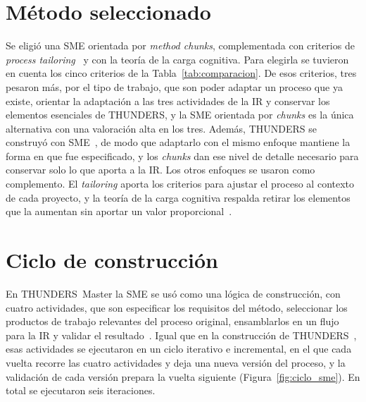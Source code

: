 \documentclass[12pt,letterpaper,oneside]{report}
\begin{document}
\section{Método seleccionado}
\label{sec:metodo_seleccionado}
Se eligió una SME orientada por \textit{method chunks}, complementada con
criterios de \textit{process tailoring}~\cite{kalus2013tailoring} y con la
teoría de la carga cognitiva. Para elegirla se tuvieron en cuenta los cinco
criterios de la Tabla~\ref{tab:comparacion}. De esos criterios, tres pesaron más, por el tipo de
trabajo, que son poder adaptar un proceso que ya existe, orientar la adaptación
a las tres actividades de la IR y conservar los elementos esenciales de
THUNDERS, y la SME orientada por \textit{chunks} es la única alternativa con una
valoración alta en los tres. Además, THUNDERS se construyó con
SME~\cite{agredo2022thesis}, de modo que adaptarlo con el mismo enfoque mantiene
la forma en que fue especificado, y los \textit{chunks} dan ese nivel de detalle
necesario para conservar solo lo que aporta a la IR. Los otros enfoques se
usaron como complemento. El \textit{tailoring} aporta los criterios para ajustar
el proceso al contexto de cada proyecto, y la teoría de la carga cognitiva
respalda retirar los elementos que la aumentan sin aportar un valor
proporcional~\cite{sweller1988}.

\section{Ciclo de construcción}
\label{sec:ciclo_construccion}
En THUNDERS~Master la SME se usó como una lógica de construcción, con cuatro
actividades, que son especificar los requisitos del método, seleccionar los
productos de trabajo relevantes del proceso original, ensamblarlos en un flujo para la IR y
validar el resultado~\cite{ralyte2001assembly}. Igual que en la construcción
de THUNDERS~\cite{agredo2022thesis}, esas actividades se ejecutaron en un ciclo
iterativo e incremental, en el que cada vuelta recorre las cuatro actividades y
deja una nueva versión del proceso, y la validación de cada versión prepara la
vuelta siguiente (Figura~\ref{fig:ciclo_sme}). En total se ejecutaron seis
iteraciones.
\end{document}
